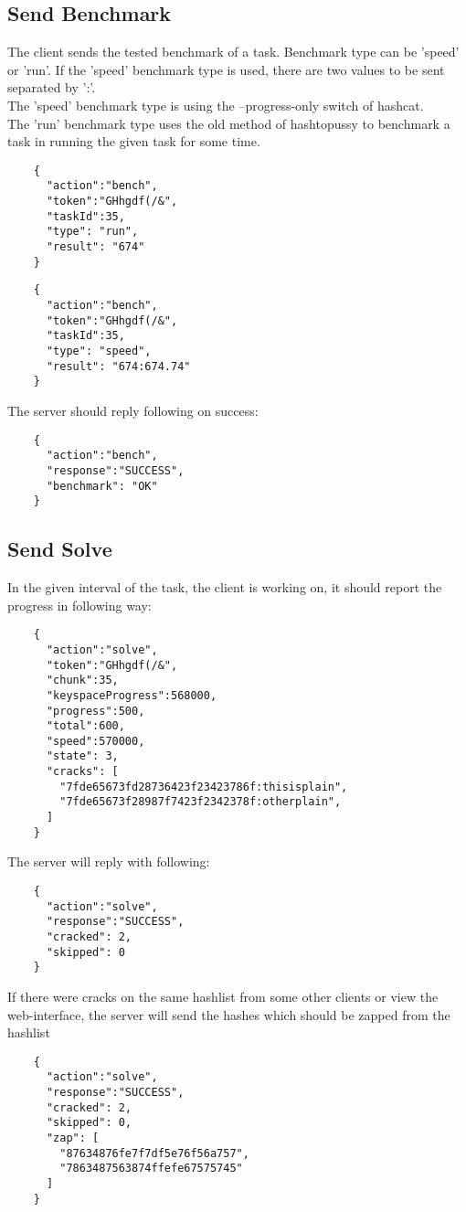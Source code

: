 \documentclass{article}
\begin{document}
	\subsection*{Send Benchmark}
	The client sends the tested benchmark of a task. Benchmark type can be 'speed' or 'run'. If the 'speed' benchmark type is used, there are two values to be sent separated by ':'. \\
	The 'speed' benchmark type is using the --progress-only switch of hashcat. \\
	The 'run' benchmark type uses the old method of hashtopussy to benchmark a task in running the given task for some time.
	\begin{verbatim}
	{
	  "action":"bench",
	  "token":"GHhgdf(/&",
	  "taskId":35,
	  "type": "run",
	  "result": "674"
	}
	\end{verbatim}
	\begin{verbatim}
	{
	  "action":"bench",
	  "token":"GHhgdf(/&",
	  "taskId":35,
	  "type": "speed",
	  "result": "674:674.74"
	}
	\end{verbatim}
	The server should reply following on success:
	\begin{verbatim}
	{
	  "action":"bench",
	  "response":"SUCCESS",
	  "benchmark": "OK"
	}
	\end{verbatim}
	
	
	\subsection*{Send Solve}
	In the given interval of the task, the client is working on, it should report the progress in following way:
	\begin{verbatim}
	{
	  "action":"solve",
	  "token":"GHhgdf(/&",
	  "chunk":35,
	  "keyspaceProgress":568000,
	  "progress":500,
	  "total":600,
	  "speed":570000,
	  "state": 3,
	  "cracks": [
	    "7fde65673fd28736423f23423786f:thisisplain",
	    "7fde65673f28987f7423f2342378f:otherplain",
	  ]
	}
	\end{verbatim}
	The server will reply with following:
	\begin{verbatim}
	{
	  "action":"solve",
	  "response":"SUCCESS",
	  "cracked": 2,
	  "skipped": 0
	}
	\end{verbatim}
	If there were cracks on the same hashlist from some other clients or view the web-interface, the server will send the hashes which should be zapped from the hashlist
	\begin{verbatim}
	{
	  "action":"solve",
	  "response":"SUCCESS",
	  "cracked": 2,
	  "skipped": 0,
	  "zap": [
	    "87634876fe7f7df5e76f56a757",
	    "7863487563874ffefe67575745"
	  ]
	}
	\end{verbatim}
\end{document}
